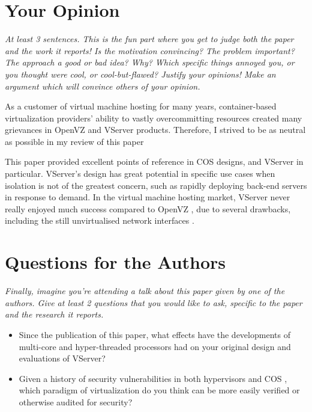 \documentclass[11pt]{article}
\begin{document}
\section*{Your Opinion}
\textsl{At least 3 sentences. This is the fun part where you get to judge both the paper and the work it reports! Is the motivation convincing? The problem important? The approach a good or bad idea?  Why? Which specific things annoyed you, or you thought were cool, or cool-but-flawed? Justify your opinions! Make an argument which will convince others of your opinion.}

As a customer of virtual machine hosting for many years, container-based virtualization providers' ability to vastly overcommitting resources created many grievances in OpenVZ and VServer products. Therefore, I strived to be as neutral as possible in my review of this paper

This paper provided excellent points of reference in COS designs, and VServer in particular. VServer's design has great potential in specific use cases when isolation is not of the greatest concern, such as rapidly deploying back-end servers in response to demand. In the virtual machine hosting market, VServer never really enjoyed much success compared to OpenVZ \cite{zhou2015comparison}, due to several drawbacks, including the still unvirtualised network interfaces \cite{vservernetwork}.

\section*{Questions for the Authors}
\textsl{Finally, imagine you're attending a talk about this paper given by one of the authors. Give at least 2 questions that you would like to ask, specific to the paper and the research it reports.}

\begin{itemize}
	\item Since the publication of this paper, what effects have the developments of multi-core and hyper-threaded processors had on your original design and evaluations of VServer?
	\item Given a history of security vulnerabilities in both hypervisors and COS \cite{costan2017secure}, which paradigm of virtualization do you think can be more easily verified or otherwise audited for security?
\end{itemize}


\footnotesize{}
\end{document}
